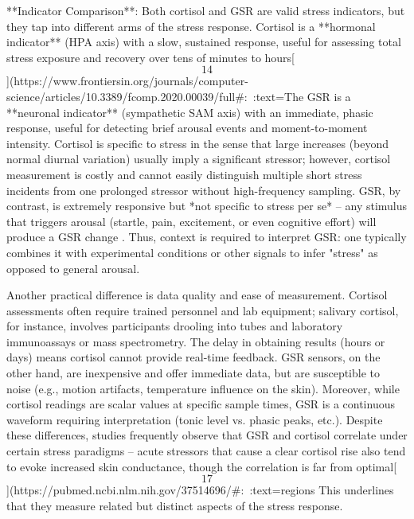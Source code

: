 \documentclass[12pt,a4paper]{article}
\begin{document}
**Indicator Comparison**: Both cortisol and GSR are valid stress
indicators, but they tap into different arms of the stress response.
Cortisol is a **hormonal indicator** (HPA axis) with a slow, sustained
response, useful for assessing total stress exposure and recovery over
tens of minutes to
hours[\[14\]](https://www.frontiersin.org/journals/computer-science/articles/10.3389/fcomp.2020.00039/full#:~:text=The%
GSR is a **neuronal indicator** (sympathetic SAM axis) with an
immediate, phasic response, useful for detecting brief arousal events
and moment-to-moment intensity. Cortisol is specific to stress in the
sense that large increases (beyond normal diurnal variation) usually
imply a significant stressor; however, cortisol measurement is costly
and cannot easily distinguish multiple short stress incidents from one
prolonged stressor without high-frequency sampling. GSR, by contrast, is
extremely responsive but *not specific to stress per se* -- any stimulus
that triggers arousal (startle, pain, excitement, or even cognitive
effort) will produce a GSR
change \citep{Boucsein2012}.
Thus, context is required to interpret GSR: one typically combines it
with experimental conditions or other signals to infer "stress" as
opposed to general arousal.

Another practical difference is data quality and ease of measurement.
Cortisol assessments often require trained personnel and lab equipment;
salivary cortisol, for instance, involves participants drooling into
tubes and laboratory immunoassays or mass spectrometry. The delay in
obtaining results (hours or days) means cortisol cannot provide
real-time feedback. GSR sensors, on the other hand, are inexpensive and
offer immediate data, but are susceptible to noise (e.g., motion
artifacts, temperature influence on the skin). Moreover, while cortisol
readings are scalar values at specific sample times, GSR is a continuous
waveform requiring interpretation (tonic level vs. phasic peaks, etc.).
Despite these differences, studies frequently observe that GSR and
cortisol correlate under certain stress paradigms -- acute stressors
that cause a clear cortisol rise also tend to evoke increased skin
conductance, though the correlation is far from
optimal[\[17\]](https://pubmed.ncbi.nlm.nih.gov/37514696/#:~:text=regions%
This underlines that they measure related but distinct aspects of the
stress response.
\end{document}
